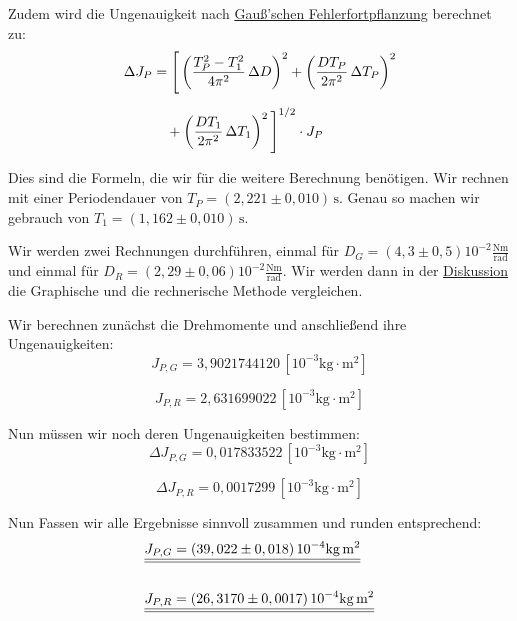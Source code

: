 Zudem wird die Ungenauigkeit nach \hyperref[eq:gauss_fehlfortpflanzung]{Gauß'schen Fehlerfortpflanzung} berechnet zu:
\begin{align}
\Delta J_P &= \Bigg[
    \left( \frac{T_P^2 - T_1^2}{4\pi^2} \, \Delta D \right)^2
    + \left( \frac{D T_P}{2\pi^2} \, \Delta T_P \right)^2 \notag \\[6pt]
&\quad
    + \left( \frac{D T_1}{2\pi^2} \, \Delta T_1 \right)^2
\Bigg]^{1/2} \cdot J_P
\end{align}

Dies sind die Formeln, die wir für die weitere Berechnung benötigen. Wir rechnen mit einer Periodendauer von $T_P = (2,221 \pm 0,010)\, \mathrm{s}$.
Genau so machen wir gebrauch von $T_1 = (1,162 \pm 0,010)\, \mathrm{s}$.

Wir werden zwei Rechnungen durchführen, einmal für $D_G =(4,3 \pm 0,5) 10^{-2} \mathrm{\frac{Nm}{rad}}$ und einmal für
$D_R =(2,29 \pm 0,06) 10^{-2} \mathrm{\frac{Nm}{rad}}$. Wir werden dann in der \hyperref[Diskussion]{Diskussion} die Graphische und die rechnerische Methode vergleichen.

Wir berechnen zunächst die Drehmomente und anschließend ihre Ungenauigkeiten:
\begin{equation}
    J_{P,G} = 3,9021744120 \, [\mathrm{10^{-3} kg \cdot m^2}]
    \label{eq:J_P_G}
\end{equation}

\begin{equation}
    J_{P,R} = 2,631699022 \, [\mathrm{10^{-3} kg \cdot m^2}]
    \label{eq:J_P_R}
\end{equation}

Nun müssen wir noch deren Ungenauigkeiten bestimmen:
\begin{equation}
    \Delta J_{P,G} = 0,017833522 \, [\mathrm{10^{-3} kg \cdot m^2}]
\end{equation}

\begin{equation}
    \Delta J_{P,R} = 0,0017299 \, [\mathrm{10^{-3} kg \cdot m^2}]
\end{equation}

Nun Fassen wir alle Ergebnisse sinnvoll zusammen und runden entsprechend: 
\begin{align}
    &\underline{\underline{J_{P,G} = (39,022 \pm 0,018)\, \mathrm{10^{-4}kg \, m^2}}} \\
        \notag \\
    &\underline{\underline{J_{P,R} = (26,3170 \pm 0,0017 )\, \mathrm{10^{-4} kg \, m^2}}}
\end{align}

